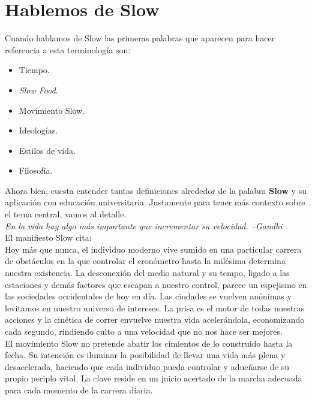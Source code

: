 \section{Hablemos de Slow}
Cuando hablamos de Slow las primeras palabras que aparecen para hacer referencia a esta terminolog\'ia son:
\begin{itemize}
 \item Tiempo.
 \item \textit{Slow Food}.
 \item Movimiento Slow.
 \item Ideolog\'ias.
 \item Estilos de vida.
 \item Filosof\'ia.
\end{itemize}
Ahora bien, cuesta entender tantas definiciones alrededor de la palabra \textbf{Slow} y su aplicaci\'on con educaci\'on universitaria. Justamente para tener m\'as
 contexto sobre el tema central, vamos al detalle. \\
\textit{En la vida hay algo m\'as importante que incrementar su velocidad. --Gandhi}\\
El manifiesto Slow cita:\\
Hoy m\'as que nunca, el individuo moderno vive sumido en una particular carrera de obst\'aculos en la que controlar el cron\'ometro hasta la mil\'esima determina
nuestra existencia. La desconexi\'on del medio natural y su tempo, ligado a las estaciones y dem\'as factores que escapan a nuestro control, parece un espejismo
en las sociedades occidentales de hoy en d\'ia. Las ciudades se vuelven an\'onimas y levitamos en nuestro universo de intereses. La prisa es el motor de todas 
nuestras acciones y la cin\'etica de correr envuelve nuestra vida aceler\'andola, economizando cada segundo, rindiendo culto a una velocidad que no nos hace ser 
mejores.\\
El movimiento Slow no pretende abatir los cimientos de lo construido hasta la fecha. Su intenci\'on es iluminar la posibilidad de llevar una vida m\'as plena y 
desacelerada, haciendo que cada individuo pueda controlar y adue\~narse de su propio periplo vital. La clave reside en un juicio acertado de la marcha adecuada 
para cada momento de la carrera diaria.


